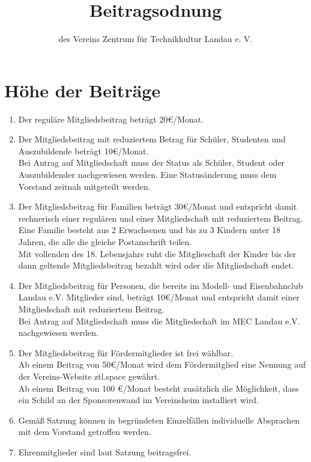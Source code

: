\documentclass[a4paper, 12pt]{scrartcl}
\begin{document}
\title{Beitragsodnung}
\subtitle{des Vereins Zentrum für Technikkultur Landau e. V.}
\author{}
\date{}

\maketitle

\section{Höhe der Beiträge}
\begin{enumerate}
	\item Der reguläre Mitgliedsbeitrag beträgt 20\euro/Monat.
	\item Der Mitgliedsbeitrag mit reduziertem Betrag für Schüler, Studenten und Auszubildende beträgt 10\euro/Monat.\\ 
	Bei Antrag auf Mitgliedschaft muss der Status als Schüler, Student oder Auszubildender nachgewiesen werden.
	Eine Statusänderung muss dem Vorstand zeitnah mitgeteilt werden.
	\item Der Mitgliedsbeitrag für Familien beträgt 30\euro/Monat und entspricht damit rechnerisch einer regulären und einer Mitgliedschaft mit reduziertem Beitrag. \\ 
Eine Familie besteht aus 2 Erwachsenen und bis zu 3 Kindern unter 18 Jahren, die alle die gleiche Postanschrift teilen.\\
Mit vollenden des 18. Lebensjahrs ruht die Mitglieschaft der Kinder bis der dann geltende Mitgliedsbeitrag bezahlt wird oder die Mitgliedschaft endet. 
	\item Der Mitgliedsbeitrag für Personen, die bereits im Modell- und Eisenbahnclub Landau e.V. Mitglieder sind, beträgt 10\euro/Monat und entspricht damit einer Mitgliedschaft mit reduziertem Beitrag.\\ Bei Antrag auf Mitgliedschaft muss die Mitgliedschaft im MEC Landau e.V. nachgewiesen werden.
	\item Der Mitgliedsbeitrag für Fördermitglieder ist frei wählbar. \\
	Ab einem Beitrag von 50\euro/Monat wird dem Fördermitglied eine Nennung auf der Vereins-Website ztl.space gewährt. \\
	Ab einem Beitrag von 100 \euro/Monat besteht zusätzlich die Möglichkeit, dass ein Schild an der Sponsorenwand im Vereinsheim installiert wird.
	\item Gemäß Satzung können in begründeten Einzelfällen individuelle Absprachen mit dem Vorstand getroffen werden. 
	\item Ehrenmitglieder sind laut Satzung beitragsfrei.
\end{enumerate}
\end{document}
